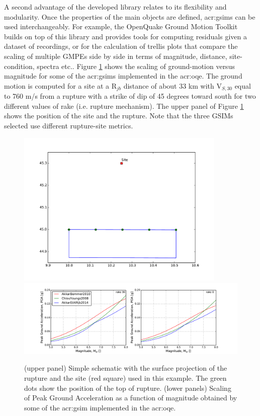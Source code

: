 A second advantage of the developed library relates to its flexibility and
modularity. Once the properties of the main objects are defined,
\glspl{acr:gsim} can be used interchangeably. 
%
For example, the OpenQuake Ground Motion Toolkit \parencite{weatherill2014}
builds on top of this library and provides tools for computing residuals given a
dataset of recordings, or for the calculation of trellis plots that compare the
scaling of multiple GMPEs side by side in terms of magnitude, distance,
site-condition, spectra etc..
%
Figure \ref{fig:gsim_mag_scaling} shows the scaling of ground-motion 
versus magnitude for some of the \glspl{acr:gsim} implemented in the 
\gls{acr:oqe}.
%
The ground motion is computed for a site at a R$_{jb}$ distance of 
about 33 km with V$_{S,30}$ equal to 760 m/s from a rupture with a 
strike of dip of 45 degrees toward south for two different values 
of rake (i.e. rupture mechanism). The upper panel of Figure 
\ref{fig:gsim_mag_scaling} shows the position of the site and 
the rupture. Note that the three GSIMs selected use different 
rupture-site metrics.
\begin{figure}[!ht]
\centering
\includegraphics[width=10cm]{./Pictures/gsim/rupture_plot.pdf}
\includegraphics[trim = 23mm 0mm 23mm 5mm, clip, width=\textwidth]
    {./Pictures/gsim/mag_scaling_example.pdf}
    \caption{
        (upper panel)
        Simple schematic with the surface projection of the 
        rupture and the site (red square) used in this example. 
        The green dots show the position of the top of rupture.
        (lower panels)
        Scaling of Peak Ground Acceleration as a function 
        of magnitude obtained by some of the \gls{acr:gsim} 
        implemented in the \gls{acr:oqe}. 
    }
\label{fig:gsim_mag_scaling}
\end{figure}
%
